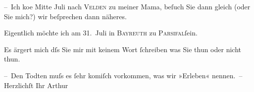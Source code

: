 \pstart
           – Ich ko{\geminationm}e Mitte Juli nach \textsc{Velden} zu meiner Mama, beſuch
               Sie dann gleich (oder Sie mich?) wir beſprechen dann näheres.\pend
           
\pstart
           Eigentlich möchte ich am {\pb}31. Juli in \textsc{Bayreuth} zu \textsc{Parsifal}ſein.\pend
           
\pstart
           Es ärgert mich dſs Sie mir mit keinem Wort{ }ſchreiben was Sie thun oder nicht
               thun.\pend
           
\pstart
           – Den Todten muſs es{ }ſehr komiſch vorkommen, was wir »Erleben« nennen. –\pend
           \pstart Herzlichſt Ihr \spacefill\mbox{Arthur}\pend{}\endnumbering{}  \newcommand{\dateiname}{L00933}\newcommand{\titel}{Arthur Schnitzler an Richard Beer-Hofmann, 6. 7. 1899}\newcommand{\editorInnen}{Martin Anton Müller und Gerd-Hermann Susen}
